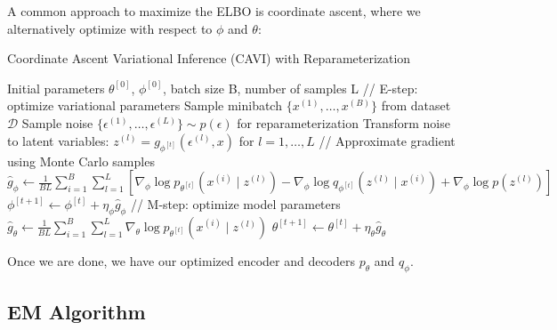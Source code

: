   \begin{algo}
    A common approach to maximize the ELBO is coordinate ascent, where we alternatively optimize with respect to $\phi$ and $\theta$:

    \begin{algorithm}[H]
      \caption{Coordinate Ascent Variational Inference (CAVI) with Reparameterization}
      \begin{algorithmic}[1]
        \Require Initial parameters $\theta^{[0]}$, $\phi^{[0]}$, batch size B, number of samples L
          \State // E-step: optimize variational parameters
          \State Sample minibatch $\{x^{(1)}, \ldots, x^{(B)}\}$ from dataset $\mathcal{D}$
          \State Sample noise $\{\epsilon^{(1)}, \ldots, \epsilon^{(L)}\} \sim p(\epsilon)$ for reparameterization
          \State Transform noise to latent variables: $z^{(l)} = g_{\phi^{[t]}}(\epsilon^{(l)}, x)$ for $l=1,\ldots,L$
          \State // Approximate gradient using Monte Carlo samples
          \State $\hat{g}_\phi \gets \frac{1}{BL} \sum_{i=1}^B \sum_{l=1}^L [\nabla_\phi \log p_{\theta^{[t]}}(x^{(i)} \mid z^{(l)}) - \nabla_\phi \log q_{\phi^{[t]}}(z^{(l)} \mid x^{(i)}) + \nabla_\phi \log p(z^{(l)})]$
          \State $\phi^{[t+1]} \gets \phi^{[t]} + \eta_\phi \hat{g}_\phi$ 
          \State // M-step: optimize model parameters
          \State $\hat{g}_\theta \gets \frac{1}{BL} \sum_{i=1}^B \sum_{l=1}^L \nabla_\theta \log p_{\theta^{[t]}}(x^{(i)} \mid z^{(l)})$
          \State $\theta^{[t+1]} \gets \theta^{[t]} + \eta_\theta \hat{g}_\theta$ 
        \EndWhile
      \end{algorithmic}
    \end{algorithm}
  \end{algo} 

  Once we are done, we have our optimized encoder and decoders $p_\theta$ and $q_\phi$. 

\subsection{EM Algorithm} 

